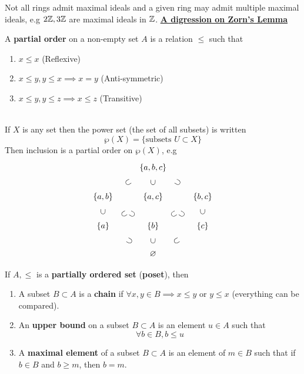 \documentclass[../Main.tex]{subfiles}
\begin{document}
Not all rings admit maximal ideals and a given ring may admit multiple maximal ideals, e.g $2\mathbb{Z},3\mathbb{Z}$ are maximal ideals in $\mathbb{Z}$.
\newpage
\underline{\textbf{\Large A digression on Zorn's Lemma}}~\\
\begin{dfn}[title = Partial Order]
	A \textbf{partial order} on a non-empty set $A$ is a relation $\le$ such that
	\begin{enumerate}
		\item $x\le x$ (Reflexive)
		\item $x\le y, y\le x \implies x =y$ (Anti-symmetric)
		\item $x\le y, y\le z\implies x\le z$ (Transitive)
	\end{enumerate}
\end{dfn}
\begin{example}~\\
	If $X$ is any set then the power set (the set of all subsets) is written
	\[\wp(X) = \{\text{subsets } U \subset X\}\]
	Then inclusion is a partial order on $\wp(X)$, e.g \[
	\begin{tikzcd}
	& \{a,b,c\} \\
	\{a,b\}\arrow[ur, phantom, "\subset"{sloped}] & \{a,c\}\arrow[u, phantom, "\subset"{sloped}] & \{b,c\}\arrow[ul, phantom, "\supset"{sloped}] \\
	\{a\}\arrow[u, phantom, "\subset"{sloped}]\arrow[ur, phantom, "\subset"{sloped}, pos=.4] & \{b\}\arrow[ul, phantom, "\supset"{sloped}, pos=.4]\arrow[ur, phantom, "\subset"{sloped}, pos=.4] & \{c\}\arrow[ul, phantom, "\supset"{sloped}, pos=.4]\arrow[u, phantom, "\subset"{sloped}] \\
	& \varnothing\arrow[ul, phantom, "\supset"{sloped}]\arrow[u, phantom, "\subset"{sloped}]\arrow[ur, phantom, "\subset"{sloped}]
	\end{tikzcd}
	\]
\end{example}
\begin{dfn}[title = {Poset, Chain, Upper Bound, Maximal Element}]
	If $A,\le$ is a \textbf{partially ordered set} (\textbf{poset}), then
	\begin{enumerate}
		\item A subset $B\subset A$ is a \textbf{chain} if $\forall x,y \in B \implies x\le y$ or $y\le x$ (everything can be compared).
		\item An \textbf{upper bound} on a subset $B\subset A$ is an element $u\in A$ such that \[\forall b\in B, b\le u\]
		\item A \textbf{maximal element} of a subset $B\subset A$ is an element of $m\in B$ such that if $b\in B$ and $b\ge m$, then $b=m$.
	\end{enumerate}
\end{dfn}
\end{document}
